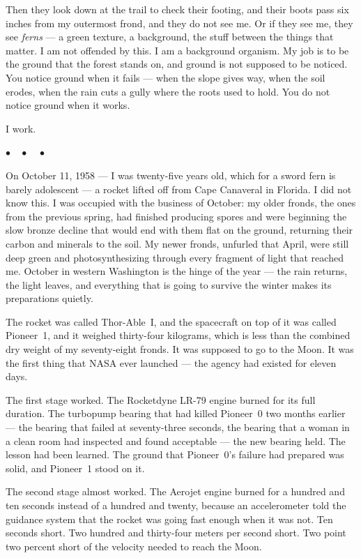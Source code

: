 \documentclass[12pt, letterpaper]{article}
\begin{document}
Then they look down at the trail to check their footing, and their boots pass six inches from my outermost frond, and they do not see me. Or if they see me, they see \textit{ferns} --- a green texture, a background, the stuff between the things that matter. I am not offended by this. I am a background organism. My job is to be the ground that the forest stands on, and ground is not supposed to be noticed. You notice ground when it fails --- when the slope gives way, when the soil erodes, when the rain cuts a gully where the roots used to hold. You do not notice ground when it works.

I work.

\begin{center}
$\bullet\quad\bullet\quad\bullet$
\end{center}

On October 11, 1958 --- I was twenty-five years old, which for a sword fern is barely adolescent --- a rocket lifted off from Cape Canaveral in Florida. I did not know this. I was occupied with the business of October: my older fronds, the ones from the previous spring, had finished producing spores and were beginning the slow bronze decline that would end with them flat on the ground, returning their carbon and minerals to the soil. My newer fronds, unfurled that April, were still deep green and photosynthesizing through every fragment of light that reached me. October in western Washington is the hinge of the year --- the rain returns, the light leaves, and everything that is going to survive the winter makes its preparations quietly.

The rocket was called Thor-Able~I, and the spacecraft on top of it was called Pioneer~1, and it weighed thirty-four kilograms, which is less than the combined dry weight of my seventy-eight fronds. It was supposed to go to the Moon. It was the first thing that NASA ever launched --- the agency had existed for eleven days.

The first stage worked. The Rocketdyne LR-79 engine burned for its full duration. The turbopump bearing that had killed Pioneer~0 two months earlier --- the bearing that failed at seventy-three seconds, the bearing that a woman in a clean room had inspected and found acceptable --- the new bearing held. The lesson had been learned. The ground that Pioneer~0's failure had prepared was solid, and Pioneer~1 stood on it.

The second stage almost worked. The Aerojet engine burned for a hundred and ten seconds instead of a hundred and twenty, because an accelerometer told the guidance system that the rocket was going fast enough when it was not. Ten seconds short. Two hundred and thirty-four meters per second short. Two point two percent short of the velocity needed to reach the Moon.
\end{document}
